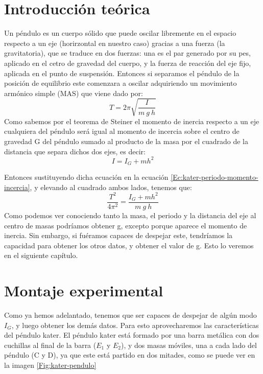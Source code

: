 \documentclass[12pt,a4paper]{book}
\begin{document}
\section{Introducción teórica}
Un péndulo es un cuerpo sólido que puede oscilar libremente en el espacio respecto a un eje (horirzontal en nuestro caso) gracias a una fuerza (la gravitatoria), que se traduce en dos fuerzas: una es el par generado por su pes, aplicado en el cetro de gravedad del cuerpo, y la fuerza de reacción del eje fijo, aplicada en el punto de suspensión. Entonces si separamos el péndulo de la posición de equilibrio este comenzara a oscilar adquiriendo un movimiento armónico simple (MAS) que viene dado por:
\begin{equation}
T=2\pi \sqrt{\dfrac{I}{m \ g \ h}}
\label{Ec:kater-periodo-momento-incercia}
\end{equation}
Como sabemos por el teorema de Steiner el momento de inercia respecto a un eje cualquiera del péndulo será igual al momento de incercia sobre el centro de gravedad G del péndulo sumado al producto de la masa por el cuadrado de la distancia que separa dichos dos ejes, es decir:
\begin{equation}
I=I_G+mh^2
\label{Ec:kater-teorema-steiner}
\end{equation}

Entonces sustituyendo dicha ecuación en la ecuación \ref{Ec:kater-periodo-momento-incercia}, y elevando al cuadrado ambos lados, tenemos que:
\begin{equation}
\dfrac{T^2}{4 \pi^2}=\dfrac{I_G+mh^2}{m \ g \ h}
\label{Ec:kater-periodo2-momento-incercia}
\end{equation}
Como podemos ver conociendo tanto la masa, el periodo y la distancia del eje al centro de masas podríamos obtener g, excepto porque aparece el momento de inercia. Sin embargo, si fuéramos capaces de despejar este, tendríamos la capacidad para obtener los otros datos, y obtener el valor de g. Esto lo veremos en el siguiente capítulo.

\section{Montaje experimental}
Como ya hemos adelantado, tenemos que ser capaces de despejar de algún modo $I_G$, y luego obtener los demás datos. Para esto aprovecharemos las características del péndulo kater. El péndulo kater está formado por una barra metálica con dos cuchillas al final de la barra ($E_1$ y $E_2$), y dos masas móviles, una a cada lado del péndulo (C y D), ya que este está partido en dos mitades, como se puede ver en la imagen \ref{Fig:kater-pendulo} \\
\end{document}
